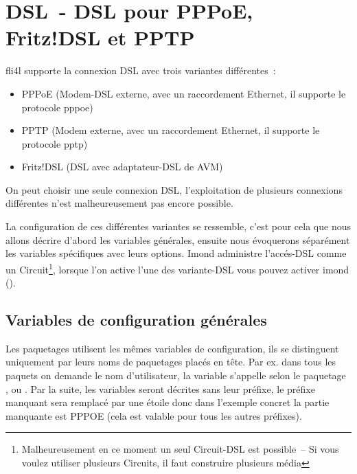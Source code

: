 
\section{DSL~- DSL pour PPPoE, Fritz!DSL et PPTP}

fli4l supporte la connexion DSL avec trois variantes différentes~:

\begin{itemize}
\item PPPoE (Modem-DSL externe, avec un raccordement Ethernet, il supporte
  le protocole pppoe)
\item PPTP (Modem externe, avec un raccordement Ethernet, il supporte
  le protocole pptp)
\item Fritz!DSL (DSL avec adaptateur-DSL de AVM)
\end{itemize}

On peut choisir une seule connexion DSL, l'exploitation de plusieurs
connexions différentes n'est malheureusement pas encore possible.

La configuration de ces différentes variantes se ressemble, c'est pour
cela que nous allons décrire d'abord les variables générales, ensuite
nous évoquerons séparément les variables spécifiques avec leurs options.
Imond administre l'accés-DSL comme un Circuit\footnote {Malheureusement
en ce moment un seul Circuit-DSL est possible~-- Si vous voulez utiliser
plusieurs Circuits, il faut construire plusieurs média}, lorsque
l'on active l'une des variante-DSL vous pouvez activer imond
().

\subsection {Variables de configuration générales}

Les paquetages utilisent les mêmes variables de configuration, ils se
distinguent uniquement par leurs noms de paquetages placés en tête. Par ex.
dans tous les paquets on demande le nom d'utilisateur, la variable
s'appelle selon le paquetage ,  ou
. Par la suite, les variables seront décrites sans
leur préfixe, le préfixe manquant sera remplacé par une étoile donc
dans l'exemple concret la partie manquante est PPPOE (cela est valable
pour tous les autres préfixes).

